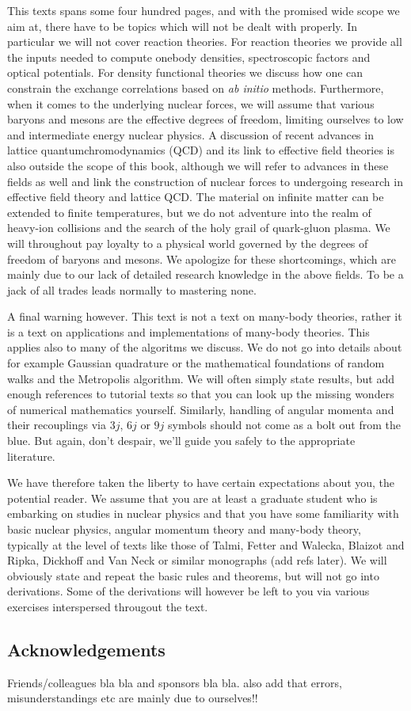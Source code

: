 This texts spans some four hundred pages, and with the promised wide scope we aim at, 
there have to be topics which will not be dealt with properly.
In particular we will not cover  reaction theories.  
For reaction theories we provide all the inputs needed to compute
onebody densities, spectroscopic factors and optical potentials. 
For density functional theories we discuss how one can constrain the exchange correlations based on {\em ab initio} methods.
Furthermore, when it comes to the underlying nuclear forces, we will assume that various baryons and mesons are the 
effective degrees of freedom, limiting ourselves to low and intermediate energy nuclear physics.  A discussion of recent 
advances in lattice quantumchromodynamics (QCD) and its link to effective field theories is also outside the scope
of this book, although we will refer to advances in these fields as well and link the construction of nuclear forces to
undergoing research in effective field theory and lattice QCD.  
The material on infinite matter can be extended to finite temperatures, but we do not 
adventure into the realm of heavy-ion collisions and the search of the holy grail of quark-gluon plasma. 
We will throughout pay loyalty to a physical world governed by the degrees of freedom of baryons and mesons.
We apologize for these shortcomings, which are mainly due to
our lack of detailed research knowledge in the above fields. To be a jack of all trades leads normally to mastering none.

A final warning however.
This text is not a text on many-body theories, rather it is
a text on applications and implementations of many-body theories. This applies also to many of the algoritms  we discuss.  We do not go into
details about for example Gaussian quadrature or the mathematical foundations of random walks and the Metropolis algorithm.  We will often simply state results, but add 
enough references to tutorial texts so that you can look up the missing wonders of numerical mathematics yourself.
Similarly,  handling of angular momenta and their recouplings via $3j$, $6j$ or $9j$ symbols should  not  come as a bolt out from the blue. But again, don't despair,
we'll guide you safely to the appropriate literature.

We have therefore taken the liberty to have  certain expectations about you, the potential reader.  
We assume that you are at least a graduate student who is embarking on studies in 
nuclear physics and that
you have some familiarity with basic nuclear physics, angular momentum theory and many-body theory, 
typically at the level of texts like those of Talmi, Fetter and Walecka, Blaizot and Ripka, Dickhoff and Van Neck or similar monographs (add refs later). 
We will obviously state and repeat the basic rules and theorems, but will not go into derivations.  
Some of the derivations will however be left to you via various exercises interspersed througout the text.


\subsection*{Acknowledgements}
Friends/colleagues bla bla  and sponsors bla bla. also add that errors, misunderstandings etc are mainly due to ourselves!!







 






